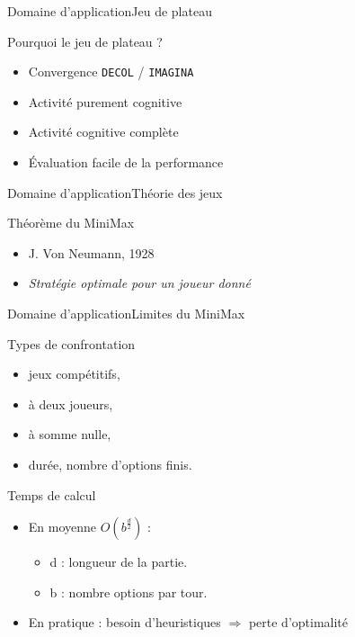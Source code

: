 \begin{frame}{Domaine d'application}{Jeu de plateau}

\begin{block}{Pourquoi le jeu de plateau ?}
\begin{itemize}
\item Convergence \texttt{DECOL} / \texttt{IMAGINA}
\pause
\item Activité purement cognitive
\pause
\item Activité cognitive complète
\pause
\item Évaluation facile de la performance
\end{itemize}
\end{block}

\end{frame}


\begin{frame}{Domaine d'application}{Théorie des jeux}

\begin{block}{Théorème du MiniMax}
\begin{itemize}
\item J. Von Neumann, 1928
\item \textit{Stratégie optimale pour un joueur donné}
\end{itemize}
\end{block}
\end{frame}



\begin{frame}{Domaine d'application}{Limites du MiniMax}

\begin{block}{Types de confrontation}
\begin{itemize}
\item jeux compétitifs,
\item à deux joueurs,
\item à somme nulle,
\item durée, nombre d'options finis.
\end{itemize}
\end{block}

\pause

\begin{block}{Temps de calcul}
\begin{itemize}
\item En moyenne \emph{$O(b^{\frac{d}{2}})$} :
	\begin{itemize}
	\item d : longueur de la partie.
	\item b : nombre options par tour.
	\end{itemize}
\item En pratique : besoin d'heuristiques $\Rightarrow$ perte d'optimalité
\end{itemize}
\end{block}

\end{frame}